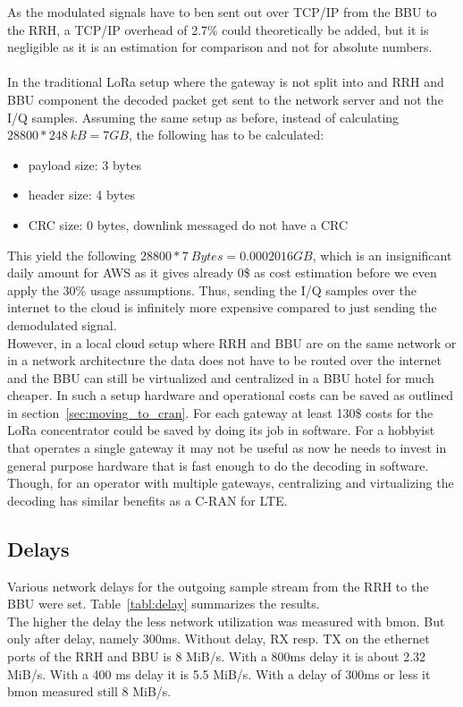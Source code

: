 As the modulated signals have to ben sent out over TCP/IP from the BBU to the RRH, a TCP/IP overhead 
of 2.7\% could theoretically be added, but it is negligible as it is an estimation for 
comparison and not for absolute numbers.
\\
\\
In the traditional LoRa setup where the gateway is not split into and RRH and BBU 
component the decoded packet get sent to the network server and not the I/Q samples.
Assuming the same setup as before, instead of calculating $28800 * 248~kB = 7 GB$, the following
has to be calculated: 

\begin{itemize}
    \item payload size: 3 bytes
    \item header size: 4 bytes
    \item CRC size: 0 bytes, downlink messaged do not have a CRC
\end{itemize}

This yield the following $28800 * 7~Bytes = 0.0002016 GB$, which is an insignificant daily amount for AWS as
it gives already 0\$ as cost estimation before we even apply the 30\% usage assumptions.
Thus, sending the I/Q samples over the internet to the cloud is infinitely more expensive compared to just 
sending the demodulated signal. 
\\
However, in a local cloud setup where RRH and BBU are on the same network
or in a network architecture the data does not have to be routed over the internet and 
the BBU can still be virtualized and centralized in a BBU hotel for much cheaper.
In such a setup hardware and operational costs can be saved as outlined in section~\ref{sec:moving_to_cran}.
For each gateway at least 130\$ costs for the LoRa concentrator could be saved by doing its job in software.
For a hobbyist that operates a single gateway it may not be useful as now he needs to invest in general purpose hardware 
that is fast enough to do the decoding in software. Though, for an operator with multiple gateways, centralizing and virtualizing
the decoding has similar benefits as a C-RAN for LTE.

\subsection{Delays}
Various network delays for the outgoing sample stream from the RRH to the BBU were set.
Table~\ref{tabl:delay} summarizes the results.
\\
The higher the delay the less network utilization was measured with bmon. But only after delay,
namely 300ms. Without delay, RX resp. TX on the ethernet ports of the RRH and BBU is 8 MiB/s.
With a 800ms delay it is about 2.32 MiB/s. With a 400 ms delay it is 5.5 MiB/s. With a delay 
of 300ms or less it bmon measured still 8 MiB/s.


